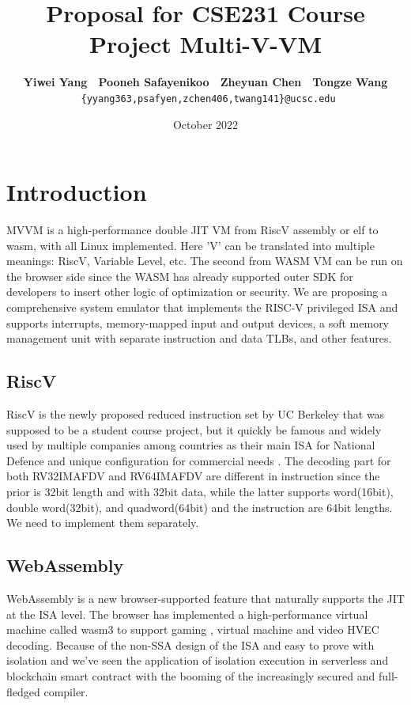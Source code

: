 \documentclass{article}
\title{Proposal for CSE231 Course Project Multi-V-VM}
\date{October 2022}
\begin{document}
\author{\textbf{Yiwei Yang}~~\textbf{Pooneh Safayenikoo}~~\textbf{Zheyuan Chen}~~\textbf{Tongze Wang} \\ \texttt{ \{yyang363,psafyen,zchen406,twang141\}@ucsc.edu}}

\maketitle

\section{Introduction}
MVVM is a high-performance double JIT VM from RiscV assembly or elf to wasm, with all Linux implemented. Here 'V' can be translated into multiple meanings: RiscV, Variable Level, etc. The second from WASM VM can be run on the browser side since the WASM has already supported outer SDK for developers to insert other logic of optimization or security. We are proposing a comprehensive system emulator that implements the RISC-V privileged ISA and supports interrupts, memory-mapped input and output devices, a soft memory management unit with separate instruction and data TLBs, and other features.

\subsection{RiscV}
RiscV is the newly proposed reduced instruction set by UC Berkeley that was supposed to be a student course project, but it quickly be famous and widely used by multiple companies among countries as their main ISA for National Defence \cite{nasa} and unique configuration for commercial needs \cite{alibaba}. The decoding part for both RV32IMAFDV and RV64IMAFDV are different in instruction since the prior is 32bit length and with 32bit data, while the latter supports word(16bit), double word(32bit), and quadword(64bit) and the instruction are 64bit lengths. We need to implement them separately.

\subsection{WebAssembly}
WebAssembly is a new browser-supported feature that naturally supports the JIT at the ISA level. The browser has implemented a high-performance virtual machine called wasm3 \cite{wasm3} to support gaming \cite{senpai}, virtual machine \cite{windows2000} and video HVEC decoding\cite{bilibili}. Because of the non-SSA design of the ISA and easy to prove with isolation \cite{kwasm} and we've seen the application of isolation execution in serverless \cite{occlum} and blockchain smart contract with the booming of the increasingly secured and full-fledged compiler. 
\end{document}
